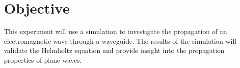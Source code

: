 \section{Objective}\label{sec:objective}
This experiment will use a \mefisto{} simulation to investigate the propagation of an electromagnetic wave through a waveguide.
The results of the simulation will validate the Helmholtz equation and provide insight into the propagation properties of plane waves.
